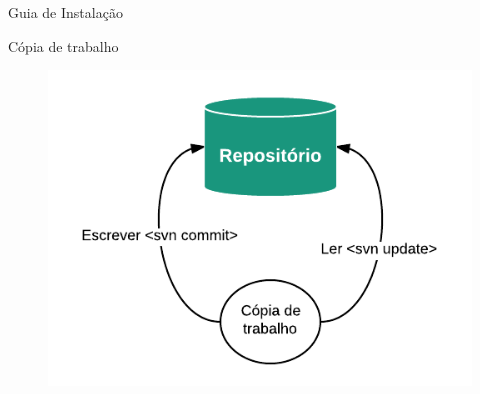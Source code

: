 \begin{frame}{Guia de Instalação}
\begin{block}{Cópia de trabalho}
  \begin{figure}[h!]
    \centering
      \includegraphics[width=1\textwidth]{figuras/repositorio_copia}
  \end{figure}
\end{block}
\end{frame}

